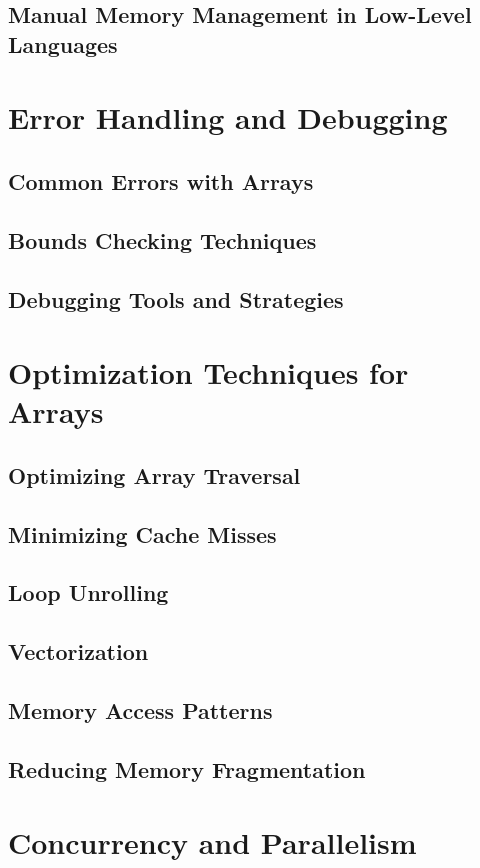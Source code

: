 \documentclass[12pt, oneside]{book}
\begin{document}
	\section{Manual Memory Management in Low-Level Languages}
	
	\chapter{Error Handling and Debugging}
	\section{Common Errors with Arrays}
	\section{Bounds Checking Techniques}
	\section{Debugging Tools and Strategies}
	
	\chapter{Optimization Techniques for Arrays}
	\section{Optimizing Array Traversal}
	\section{Minimizing Cache Misses}
	\section{Loop Unrolling}
	\section{Vectorization}
	\section{Memory Access Patterns}
	\section{Reducing Memory Fragmentation}
	
	\chapter{Concurrency and Parallelism}
\end{document}
